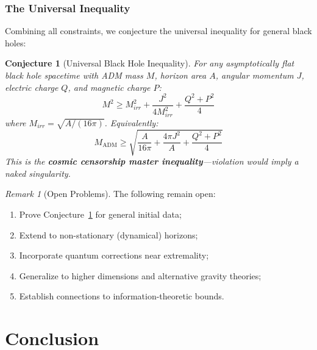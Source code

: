 \documentclass[12pt]{article}
\theoremstyle{plain}
\newtheorem{conjecture}[theorem]{Conjecture}
\theoremstyle{definition}
\theoremstyle{remark}
\newtheorem{remark}[theorem]{Remark}
\newcommand{\ADM}{\mathrm{ADM}}
\begin{document}
\subsubsection{The Universal Inequality}

Combining all constraints, we conjecture the universal inequality for general black holes:

\begin{conjecture}[Universal Black Hole Inequality]\label{conj:universal}
For any asymptotically flat black hole spacetime with ADM mass $M$, horizon area $A$, angular momentum $J$, electric charge $Q$, and magnetic charge $P$:
\begin{equation}
M^2 \geq M_{irr}^2 + \frac{J^2}{4M_{irr}^2} + \frac{Q^2 + P^2}{4}
\end{equation}
where $M_{irr} = \sqrt{A/(16\pi)}$. Equivalently:
\begin{equation}
M_{\ADM} \geq \sqrt{\frac{A}{16\pi} + \frac{4\pi J^2}{A} + \frac{Q^2 + P^2}{4}}
\end{equation}
This is the \textbf{cosmic censorship master inequality}---violation would imply a naked singularity.
\end{conjecture}

\begin{remark}[Open Problems]
The following remain open:
\begin{enumerate}
    \item Prove Conjecture~\ref{conj:universal} for general initial data;
    \item Extend to non-stationary (dynamical) horizons;
    \item Incorporate quantum corrections near extremality;
    \item Generalize to higher dimensions and alternative gravity theories;
    \item Establish connections to information-theoretic bounds.
\end{enumerate}
\end{remark}


\section{Conclusion}\label{sec:conclusion}
\end{document}
